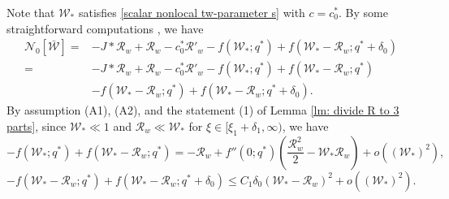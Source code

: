 \documentclass[11pt,a4paper]{article}
\numberwithin{equation}{section}
\numberwithin{figure}{section}
\begin{document}
Note that $\mathcal{W}_*$ satisfies \eqref{scalar nonlocal tw-parameter s} with $c=c_0^*$.
By some  straightforward computations , we have
\begin{equation}\label{N0 inequality step 1 nonlocal}
\begin{aligned}
\mathcal{N}_0[\bar{\mathcal{W}}]=&-J\ast \mathcal{R}_w+\mathcal{R}_w-c_0^*\mathcal{R}'_w-f(\mathcal{W}_*;q^*)+f(\mathcal{W}_*-\mathcal{R}_w;q^*+\delta_0)\\
=&-J\ast \mathcal{R}_w+\mathcal{R}_w-c_0^*\mathcal{R}'_w-f(\mathcal{W}_*;q^*)+f(\mathcal{W}_*-\mathcal{R}_w;q^*)\\
&-f(\mathcal{W}_*-\mathcal{R}_w;q^*)+f(\mathcal{W}_*-\mathcal{R}_w;q^*+\delta_0).
\end{aligned}
\end{equation}
By assumption (A1), (A2), and the statement (1) of Lemma \ref{lm: divide R to 3 parts}, since $\mathcal{W}_*\ll 1$ and $\mathcal{R}_w\ll \mathcal{W}_*$ for $\xi\in[\xi_1+\delta_1,\infty)$, we have
\begin{equation}\label{estimate 1 nonlocal}
-f(\mathcal{W}_*;q^*)+f(\mathcal{W}_*-\mathcal{R}_w;q^*)= -\mathcal{R}_w+f''(0;q^*)(\frac{\mathcal{R}^2_w}{2}-\mathcal{W}_*\mathcal{R}_w)+o((\mathcal{W}_*)^2),
\end{equation}
\begin{equation}\label{estimate 2 nonlocal}
-f(\mathcal{W}_*-\mathcal{R}_w;q^*)+f(\mathcal{W}_*-\mathcal{R}_w;q^*+\delta_0)\le C_1\delta_0(\mathcal{W}_*-\mathcal{R}_w)^2+o((\mathcal{W}_*)^2).
\end{equation}
\end{document}
